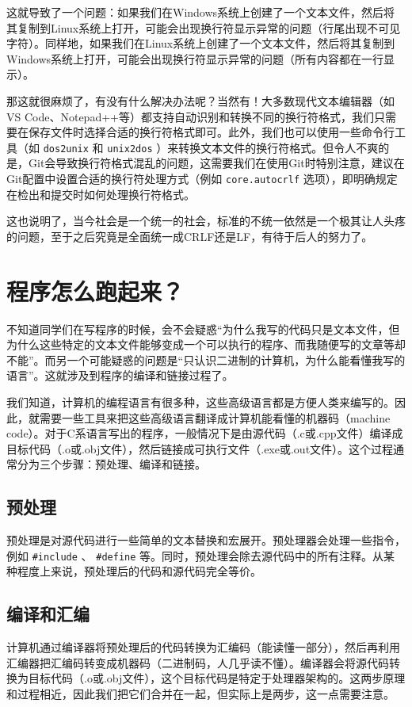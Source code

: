 这就导致了一个问题：如果我们在Windows系统上创建了一个文本文件，然后将其复制到Linux系统上打开，可能会出现换行符显示异常的问题（行尾出现不可见字符）。同样地，如果我们在Linux系统上创建了一个文本文件，然后将其复制到Windows系统上打开，可能会出现换行符显示异常的问题（所有内容都在一行显示）。

那这就很麻烦了，有没有什么解决办法呢？当然有！大多数现代文本编辑器（如VS Code、Notepad++等）都支持自动识别和转换不同的换行符格式，我们只需要在保存文件时选择合适的换行符格式即可。此外，我们也可以使用一些命令行工具（如 \texttt{dos2unix} 和 \texttt{unix2dos} ）来转换文本文件的换行符格式。但令人不爽的是，Git会导致换行符格式混乱的问题，这需要我们在使用Git时特别注意，建议在Git配置中设置合适的换行符处理方式（例如 \texttt{core.autocrlf} 选项），即明确规定在检出和提交时如何处理换行符格式。

这也说明了，当今社会是一个统一的社会，标准的不统一依然是一个极其让人头疼的问题，至于之后究竟是全面统一成CRLF还是LF，有待于后人的努力了。

\section{程序怎么跑起来？}

不知道同学们在写程序的时候，会不会疑惑“为什么我写的代码只是文本文件，但为什么这些特定的文本文件能够变成一个可以执行的程序、而我随便写的文章等却不能”。而另一个可能疑惑的问题是“只认识二进制的计算机，为什么能看懂我写的语言”。这就涉及到程序的编译和链接过程了。

我们知道，计算机的编程语言有很多种，这些高级语言都是方便人类来编写的。因此，就需要一些工具来把这些高级语言翻译成计算机能看懂的机器码（machine code）。对于C系语言写出的程序，一般情况下是由源代码（.c或.cpp文件）编译成目标代码（.o或.obj文件），然后链接成可执行文件（.exe或.out文件）。这个过程通常分为三个步骤：预处理、编译和链接。

\subsection{预处理}
预处理是对源代码进行一些简单的文本替换和宏展开。预处理器会处理一些指令，例如 \texttt{\#include} 、 \texttt{\#define} 等。同时，预处理会除去源代码中的所有注释。从某种程度上来说，预处理后的代码和源代码完全等价。

\subsection{编译和汇编}
计算机通过编译器将预处理后的代码转换为汇编码（能读懂一部分），然后再利用汇编器把汇编码转变成机器码（二进制码，人几乎读不懂）。编译器会将源代码转换为目标代码（.o或.obj文件），这个目标代码是特定于处理器架构的。这两步原理和过程相近，因此我们把它们合并在一起，但实际上是两步，这一点需要注意。

